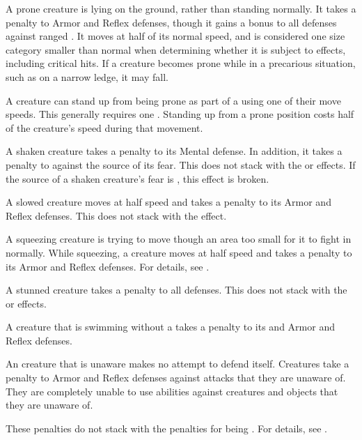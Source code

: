      A prone creature is lying on the ground, rather than standing normally.
    It takes a  penalty to Armor and Reflex defenses, though it gains a  bonus to all defenses against ranged .
    It moves at half of its normal speed, and is considered one size category smaller than normal when determining whether it is subject to  effects, including critical hits.
    If a creature becomes prone while in a precarious situation, such as on a narrow ledge, it may fall.

    A creature can stand up from being prone as part of a  using one of their move speeds.
    This generally requires one .
    Standing up from a prone position costs half of the creature's speed during that movement.

     A shaken creature takes a  penalty to its Mental defense.
    In addition, it takes a  penalty to  against the source of its fear.
    This does not stack with the \frightened or \panicked effects.
    If the source of a shaken creature's fear is , this effect is broken.

     A slowed creature moves at half speed and takes a  penalty to its Armor and Reflex defenses.
    This does not stack with the \immobilized effect.

     A squeezing creature is trying to move though an area too small for it to fight in normally.
    While squeezing, a creature moves at half speed and takes a  penalty to its Armor and Reflex defenses.
    For details, see .

     A stunned creature takes a  penalty to all defenses.
    This does not stack with the \dazed or \confused effects.

     A creature that is swimming without a  takes a  penalty to its  and Armor and Reflex defenses.

     An creature that is unaware makes no attempt to defend itself.
    Creatures take a  penalty to Armor and Reflex defenses against attacks that they are unaware of.
    They are completely unable to use  abilities against creatures and objects that they are unaware of.

    These penalties do not stack with the penalties for being \partiallyunaware.
    For details, see .

